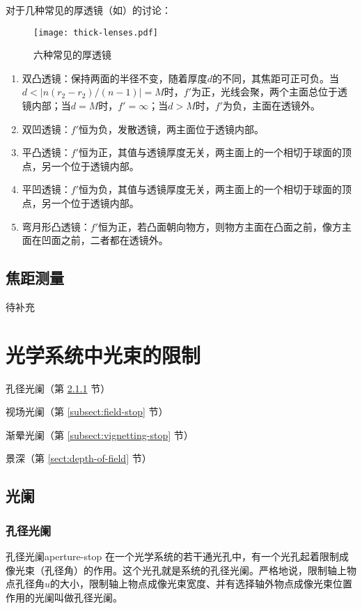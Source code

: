 \documentclass[cn,10pt,chinesefont=founder,math=newtx,cite=super,twoside]{elegantbook}
\begin{document}
对于几种常见的厚透镜（如）的讨论：
\begin{figure}[htbp]
	\centering
	\texttt{[image: thick-lenses.pdf]}
	\caption{六种常见的厚透镜}
	\label{fig:thick-lenses}
\end{figure}
\begin{enumerate}
	\item 双凸透镜：保持两面的半径不变，随着厚度$d$的不同，其焦距可正可负。当$d<|n(r_2-r_2)/(n-1)|=M$时，$f'$为正，光线会聚，两个主面总位于透镜内部；当$d=M$时，$f'=\infty$；当$d>M$时，$f'$为负，主面在透镜外。
	\item 双凹透镜：$f'$恒为负，发散透镜，两主面位于透镜内部。
	\item 平凸透镜：$f'$恒为正，其值与透镜厚度无关，两主面上的一个相切于球面的顶点，另一个位于透镜内部。
	\item 平凹透镜：$f'$恒为负，其值与透镜厚度无关，两主面上的一个相切于球面的顶点，另一个位于透镜内部。
	\item 弯月形凸透镜：$f'$恒为正，若凸面朝向物方，则物方主面在凸面之前，像方主面在凹面之前，二者都在透镜外。
\end{enumerate}

\section{焦距测量}

待补充

\chapter{光学系统中光束的限制}

\begin{introduction}
	\item 孔径光阑（第 \ref{subsect:aperture-stop} 节）
	\item 视场光阑（第 \ref{subsect:field-stop} 节）
	\item 渐晕光阑（第 \ref{subsect:vignetting-stop} 节）
	\item 景深（第 \ref{sect:depth-of-field} 节）
\end{introduction}

\section{光阑}
\subsection{孔径光阑}
\label{subsect:aperture-stop}
\begin{definition}{孔径光阑}{aperture-stop}
在一个光学系统的若干通光孔中，有一个光孔起着限制成像光束（孔径角）的作用。这个光孔就是系统的孔径光阑。严格地说，限制轴上物点孔径角$u$的大小，限制轴上物点成像光束宽度、并有选择轴外物点成像光束位置作用的光阑叫做孔径光阑。
\end{definition}
\end{document}
